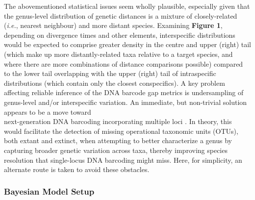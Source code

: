 \documentclass[12pt]{article}
\begin{document}
The abovementioned statistical issues seem wholly plausible, especially given that the genus-level distribution of genetic distances is a mixture of closely-related (\textit{i.e.}, nearest neighbour) and more distant species. Examining \textbf{Figure 1}, depending on divergence times and other elements, interspecific distributions would be expected to comprise greater density in the centre and upper (right) tail (which make up more distantly-related taxa relative to a target species, and where there are more combinations of distance comparisons possible) compared to the lower tail overlapping with the upper (right) tail of intraspecific \\ distributions (which contain only the closest conspecifics). A key problem affecting reliable inference of the DNA barcode gap metrics is undersampling of genus-level and/or interspecific variation. An immediate, but non-trivial solution appears to be a move toward \\ next-generation DNA barcoding incorporating multiple loci \citep{collins2014known, dowton2014preliminary}. In theory, this would facilitate the detection of missing operational taxonomic units (OTUs), both extant and extinct, when attempting to better characterize a genus by capturing broader genetic variation across taxa, thereby improving species resolution that single-locus DNA barcoding might miss. Here, for simplicity, an alternate route is taken to avoid these obstacles. 

\subsubsection{Bayesian Model Setup}
\end{document}
